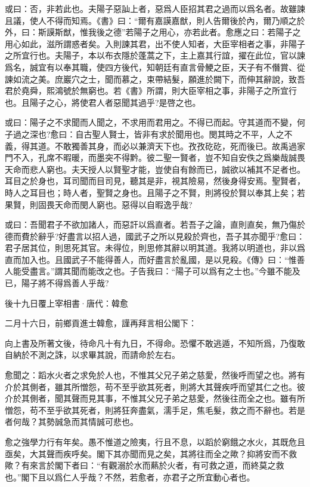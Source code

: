 \documentclass[12pt,a4paper]{ctexbook}
\begin{document}
或曰：否，非若此也。夫陽子惡訕上者，惡爲人臣招其君之過而以爲名者。故雖諫且議，使人不得而知焉。《書》曰：“爾有嘉謨嘉猷，則人告爾後於內，爾乃順之於外，曰：斯謨斯猷，惟我後之德”若陽子之用心，亦若此者。愈應之曰：若陽子之用心如此，滋所謂惑者矣。入則諫其君，出不使人知者，大臣宰相者之事，非陽子之所宜行也。夫陽子，本以布衣隱於蓬蒿之下，主上嘉其行誼，擢在此位，官以諫爲名，誠宜有以奉其職，使四方後代，知朝廷有直言骨鯁之臣，天子有不僭賞、從諫如流之美。庶巖穴之士，聞而慕之，束帶結髮，願進於闕下，而伸其辭說，致吾君於堯舜，熙鴻號於無窮也。若《書》所謂，則大臣宰相之事，非陽子之所宜行也。且陽子之心，將使君人者惡聞其過乎?是啓之也。\par
或曰：陽子之不求聞而人聞之，不求用而君用之。不得已而起。守其道而不變，何子過之深也?愈曰：自古聖人賢士，皆非有求於聞用也。閔其時之不平，人之不義，得其道。不敢獨善其身，而必以兼濟天下也。孜孜矻矻，死而後已。故禹過家門不入，孔席不暇暖，而墨突不得黔。彼二聖一賢者，豈不知自安佚之爲樂哉誠畏天命而悲人窮也。夫天授人以賢聖才能，豈使自有餘而已，誠欲以補其不足者也。耳目之於身也，耳司聞而目司見，聽其是非，視其險易，然後身得安焉。聖賢者，時人之耳目也；時人者，聖賢之身也。且陽子之不賢，則將役於賢以奉其上矣；若果賢，則固畏天命而閔人窮也。惡得以自暇逸乎哉?\par
或曰：吾聞君子不欲加諸人，而惡訐以爲直者。若吾子之論，直則直矣，無乃傷於德而費於辭乎?好盡言以招人過，國武子之所以見殺於齊也，吾子其亦聞乎?愈曰：君子居其位，則思死其官。未得位，則思修其辭以明其道。我將以明道也，非以爲直而加入也。且國武子不能得善人，而好盡言於亂國，是以見殺。《傳》曰：“惟善人能受盡言。”謂其聞而能改之也。子告我曰：“陽子可以爲有之士也。”今雖不能及已，陽子將不得爲善人乎哉?\par
後十九日覆上宰相書·唐代：韓愈 \par
二月十六日，前鄉貢進士韓愈，謹再拜言相公閣下：\par
向上書及所著文後，待命凡十有九日，不得命。恐懼不敢逃遁，不知所爲，乃復敢自納於不測之誅，以求畢其說，而請命於左右。\par
愈聞之：蹈水火者之求免於人也，不惟其父兄子弟之慈愛，然後呼而望之也。將有介於其側者，雖其所憎怨，苟不至乎欲其死者，則將大其聲疾呼而望其仁之也。彼介於其側者，聞其聲而見其事，不惟其父兄子弟之慈愛，然後往而全之也。雖有所憎怨，苟不至乎欲其死者，則將狂奔盡氣，濡手足，焦毛髮，救之而不辭也。若是者何哉？其勢誠急而其情誠可悲也。\par
愈之強學力行有年矣。愚不惟道之險夷，行且不息，以蹈於窮餓之水火，其既危且亟矣，大其聲而疾呼矣。閣下其亦聞而見之矣，其將往而全之歟？抑將安而不救歟？有來言於閣下者曰：“有觀溺於水而爇於火者，有可救之道，而終莫之救也。”閣下且以爲仁人乎哉？不然，若愈者，亦君子之所宜動心者也。\par
\end{document}
